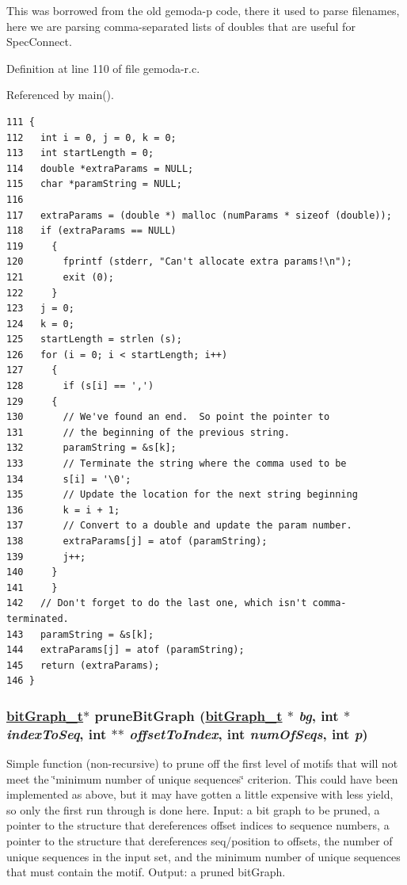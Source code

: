 This was borrowed from the old gemoda-p code, there it used to parse filenames, here we are parsing comma-separated lists of doubles that are useful for Spec\-Connect.

Definition at line 110 of file gemoda-r.c.

Referenced by main().

\scriptsize\begin{verbatim}111 {
112   int i = 0, j = 0, k = 0;
113   int startLength = 0;
114   double *extraParams = NULL;
115   char *paramString = NULL;
116 
117   extraParams = (double *) malloc (numParams * sizeof (double));
118   if (extraParams == NULL)
119     {
120       fprintf (stderr, "Can't allocate extra params!\n");
121       exit (0);
122     }
123   j = 0;
124   k = 0;
125   startLength = strlen (s);
126   for (i = 0; i < startLength; i++)
127     {
128       if (s[i] == ',')
129     {
130       // We've found an end.  So point the pointer to
131       // the beginning of the previous string.
132       paramString = &s[k];
133       // Terminate the string where the comma used to be
134       s[i] = '\0';
135       // Update the location for the next string beginning
136       k = i + 1;
137       // Convert to a double and update the param number.
138       extraParams[j] = atof (paramString);
139       j++;
140     }
141     }
142   // Don't forget to do the last one, which isn't comma-terminated.
143   paramString = &s[k];
144   extraParams[j] = atof (paramString);
145   return (extraParams);
146 }
\end{verbatim}
\normalsize 


\hypertarget{gemoda-r_8c_a2}{
\subsubsection[pruneBitGraph]{\setlength{\rightskip}{0pt plus 5cm}\hyperlink{structbitGraph__t}{bit\-Graph\_\-t}$\ast$ prune\-Bit\-Graph (\hyperlink{structbitGraph__t}{bit\-Graph\_\-t} $\ast$ {\em bg}, int $\ast$ {\em index\-To\-Seq}, int $\ast$$\ast$ {\em offset\-To\-Index}, int {\em num\-Of\-Seqs}, int {\em p})}}
\label{gemoda-r_8c_a2}


Simple function (non-recursive) to prune off the first level of motifs that will not meet the \char`\"{}minimum number of unique sequences\char`\"{} criterion. This could have been implemented as above, but it may have gotten a little expensive with less yield, so only the first run through is done here. Input: a bit graph to be pruned, a pointer to the structure that dereferences offset indices to sequence numbers, a pointer to the structure that dereferences seq/position to offsets, the number of unique sequences in the input set, and the minimum number of unique sequences that must contain the motif. Output: a pruned bit\-Graph.

